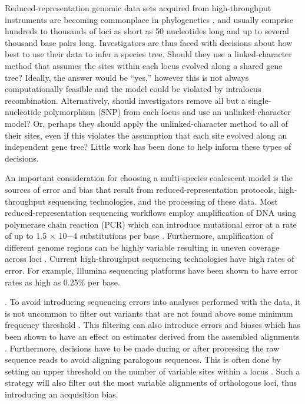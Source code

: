 Reduced-representation genomic data sets acquired from high-throughput
instruments are becoming commonplace in phylogenetics \citep{Leache2017}, and
usually comprise hundreds to thousands of loci as short as 50 nucleotides long
and up to several thousand base pairs long.
Investigators are thus faced with decisions about how best to 
use their data to infer a species tree.
Should they use a linked-character method that assumes the sites within each
locus evolved along a shared gene tree?
Ideally, the answer would be ``yes,'' however this is not always
computationally feasible and the model could be violated by intralocus
recombination.
Alternatively, should investigators remove all but a single-nucleotide
polymorphism (SNP) from each locus and use an unlinked-character model?
Or, perhaps they should apply the unlinked-character method to all of their
sites, even if this violates the assumption that each site evolved along an
independent gene tree?
Little work has been done to help inform these types of decisions. 

An important consideration for choosing a multi-species coalescent model is
the sources of error and bias that result from reduced-representation protocols,
high-throughput sequencing technologies, and the processing of these data.
Most reduced-representation sequencing workflows employ amplification of DNA  
using polymerase chain reaction (PCR) which can introduce mutational error at a 
rate of up to 1.5 × 10−4 substitutions per base \citep{potapovExaminingSourcesError2017}.
Furthermore, amplification of different genome regions can be highly variable 
resulting in uneven coverage across loci \citep{airdAnalyzingMinimizingPCR2011}. 
Current high-throughput sequencing technologies have high rates of error.
For example, Illumina sequencing platforms have been shown to have error rates
as high as 0.25\% per base. 


\citep{@pfeifferSystematicEvaluationError2018}. 
To avoid introducing sequencing errors into analyses performed with the data, it is not 
uncommon to filter out variants that are not found above some minimum frequency 
threshold \citep{rochetteStacksAnalyticalMethods2019, linckMinorAlleleFrequency2019}. 
This filtering can also introduce errors and biases which has been 
shown to have an effect on estimates derived from the assembled alignments
\citep{Harvey2015,linckMinorAlleleFrequency2019}.
Furthermore, decisions have to be made during or after processing
the raw sequence reads to avoid aligning paralogous sequences.
This is often done by setting an upper threshold on the number of variable
sites within a locus \citep{harveySimilarityThresholdsUsed2015}. 
Such a strategy will also filter out the most variable alignments
of orthologous loci, thus introducing an acquisition bias.



